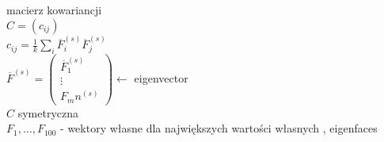 macierz kowariancji \\ 
$C = (c_{ij})$ \\ 
$c_{ij} = \frac{1}{k} \sum\limits_i \overline F_i^{(s)} \overline F_j^{(s)}$ \\ 
$\overline F^{(s)} = \begin{pmatrix} \overline F_1^{(s)} \\ 
    \vdots \\ F_mn^{(s)} \end{pmatrix} \leftarrow$ eigenvector \\ 
$C$ symetryczna \\
$F_1,\ldots,F_{100}$ - wektory własne dla największych wartości własnych , eigenfaces
